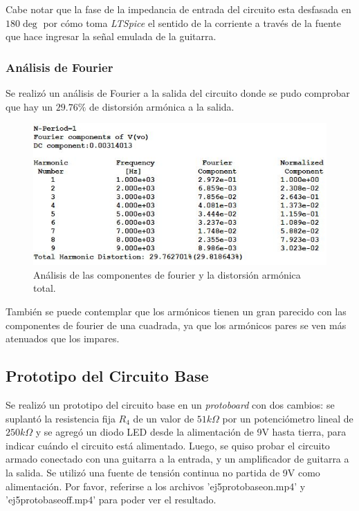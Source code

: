 Cabe notar que la fase de la impedancia de entrada del circuito esta desfasada en $180\deg$ por cómo toma \textit{LTSpice} el sentido de la corriente a través de la fuente que hace ingresar la señal emulada de la guitarra.

\subsubsection{Análisis de Fourier}

Se realizó un análisis de Fourier a la salida del circuito donde se pudo comprobar que hay un $29.76\%$ de distorsión armónica a la salida.
\begin{figure}[H]
	\centering
	\includegraphics[width=1\textwidth, trim={0 0 0 0}, clip]{Ejercicio5/Imagenes/Circuito_base/Sim/sim_base_fourier.JPG}
	\caption{Análisis de las componentes de fourier y la distorsión armónica total.}
	\label{fig:sim_base_fourier}
\end{figure}
También se puede contemplar que los armónicos tienen un gran parecido con las componentes de fourier de una cuadrada, ya que los armónicos pares se ven más atenuados que los impares.

\subsection{Prototipo del Circuito Base}
Se realizó un prototipo del circuito base en un \textit{protoboard} con dos cambios: se suplantó la resistencia fija $R_4$ de un valor de $51k\Omega$ por un potenciómetro lineal de $250k\Omega$ y se agregó un diodo LED desde la alimentación de 9V hasta tierra, para indicar cuándo el circuito está alimentado. Luego, se quiso probar el circuito armado conectado con una guitarra a la entrada, y un amplificador de guitarra a la salida. Se utilizó una fuente de tensión continua no partida de 9V como alimentación. Por favor, referirse a los archivos 'ej5protobaseon.mp4' y 'ej5protobaseoff.mp4' para poder ver el resultado.
